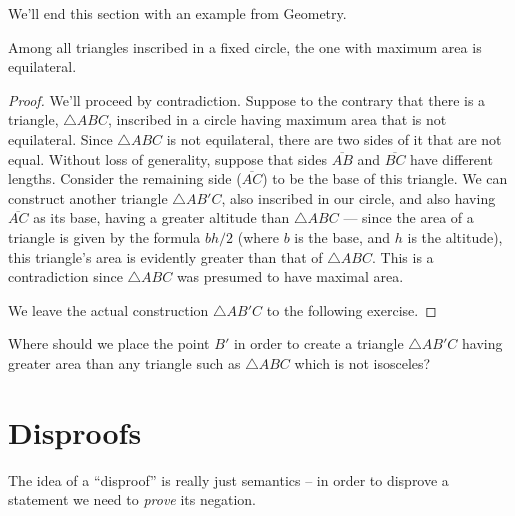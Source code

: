 We'll end this section with an example from Geometry.

\begin{thm}
Among all triangles inscribed in a fixed circle, the one with maximum
area is equilateral.
\end{thm}

\begin{proof} 
We'll proceed by contradiction.  Suppose to the contrary that there is a 
triangle, $\triangle ABC$, inscribed in a circle having maximum area that 
is not equilateral.  Since $\triangle ABC$ is not equilateral, there are 
two sides of it that are not equal.  Without loss of generality, suppose that
sides $\overline{AB}$ and $\overline{BC}$ have different lengths.   Consider
the remaining side ($\overline{AC}$) to be the base of this triangle.
We can construct another triangle $\triangle AB'C$, also inscribed in our circle, and also 
having $\overline{AC}$ as its base, having a greater altitude than
$\triangle ABC$ --- since the area of a triangle is given by
the formula $bh/2$ (where $b$ is the base, and $h$ is the altitude), 
this triangle's area is evidently greater than that of $\triangle ABC$.
This is a contradiction since $\triangle ABC$ was presumed to have 
maximal area.

We leave the actual construction $\triangle AB'C$ to the following exercise.
\end{proof}

\begin{exer}
Where should we place the point $B'$ in order to create a triangle  
$\triangle AB'C$ having
greater area than any triangle such as $\triangle ABC$ which is not isosceles?

\begin{center}

\end{center}

\end{exer}
\clearpage




\newpage

\section{Disproofs}
\label{sec:disproofs}

The idea of a ``disproof'' is really just semantics -- in order to
disprove a statement we need to \emph{prove} its negation.  

